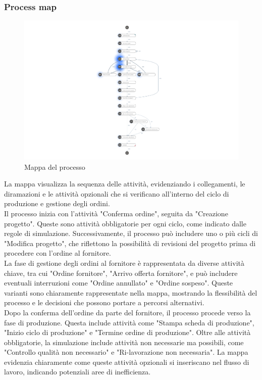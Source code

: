 \documentclass{article}
\begin{document}
\subsubsection{Process map}
\begin{figure}[H]
    \centering
    \includegraphics[width=\textwidth]{imgMicrosoft/TerzaSimulazione/ProcessMapSimulazione3.png}
    \caption{Mappa del processo}
    \label{fig:process-map}
\end{figure}
La mappa visualizza la sequenza delle attività, evidenziando i collegamenti, le diramazioni e le attività opzionali che si verificano all'interno del ciclo di produzione e gestione degli ordini.\\
Il processo inizia con l'attività "Conferma ordine", seguita da "Creazione progetto". Queste sono attività obbligatorie per ogni ciclo, come indicato dalle regole di simulazione. Successivamente, il processo può includere uno o più cicli di "Modifica progetto", che riflettono la possibilità di revisioni del progetto prima di procedere con l'ordine al fornitore.\\
La fase di gestione degli ordini al fornitore è rappresentata da diverse attività chiave, tra cui "Ordine fornitore", "Arrivo offerta fornitore", e può includere eventuali interruzioni come "Ordine annullato" e "Ordine sospeso". Queste varianti sono chiaramente rappresentate nella mappa, mostrando la flessibilità del processo e le decisioni che possono portare a percorsi alternativi.\\
Dopo la conferma dell'ordine da parte del fornitore, il processo procede verso la fase di produzione. Questa include attività come "Stampa scheda di produzione", "Inizio ciclo di produzione" e "Termine ordine di produzione". Oltre alle attività obbligatorie, la simulazione include attività non necessarie ma possibili, come "Controllo qualità non necessario" e "Ri-lavorazione non necessaria". La mappa evidenzia chiaramente come queste attività opzionali si inseriscano nel flusso di lavoro, indicando potenziali aree di inefficienza.\\
\end{document}
